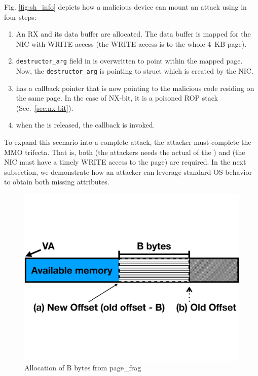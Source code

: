 Fig. \ref{fig:sh_info} depicts how a malicious device can mount an attack using \shinfo{} in four steps:
\begin{enumerate}[label=(\alph*)]
    \item An RX \skb{} and its data buffer are allocated. The data buffer is mapped for the NIC with WRITE access (the WRITE access is to the whole 4~KB page). 
    \item \texttt{destructor\_arg} field in \shinfo{} is overwritten to point within the mapped page. Now, the \texttt{destructor\_arg} is pointing to struct \uarg{} which is created by the NIC.
    \item \uarg{} has a callback pointer that is now pointing to the malicious code residing on the same page. In the case of NX-bit, it is a poisoned ROP stack (Sec.~\ref{sec:nx-bit}).
    \item when the \skb{} is released, the callback is invoked.
\end{enumerate}
To expand this scenario into a complete attack, the attacker must complete the MMO trifecta. That is, both \motivation (the attackers needs the actual \kva{} of the \mabaf{}) and \oportunity{} (the NIC must have a timely WRITE access to the page) are required. In the next subsection, we demonstrate how an attacker can leverage standard OS behavior to obtain both missing attributes.

\begin{figure}[t]
    \centering
    \includegraphics[width=0.8\linewidth,trim=0 6cm 0 6cm, clip]{figs/page_frag.pdf}
    \caption{Allocation of B bytes from page\_frag}
    \label{fig:page_frags}
\end{figure}

